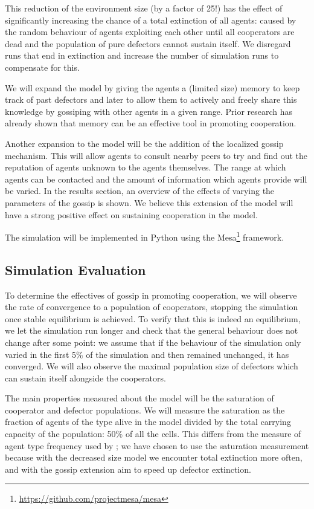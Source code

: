 \documentclass[english]{article}
\begin{document}
This reduction of the environment size (by a factor of 25!) has the effect of significantly increasing the chance of a total extinction of all agents:
caused by the random behaviour of agents exploiting each other until all cooperators are dead and the population of pure defectors cannot sustain itself.
We disregard runs that end in extinction and increase the number of simulation runs to compensate for this.

We will expand the model by giving the agents a (limited size) memory to keep track of past defectors and later to allow them to actively and freely share this knowledge by gossiping with other agents in a given range.
Prior research \citep{memory, reciprocity, adaptive-interaction} has already shown that memory can be an effective tool in promoting cooperation.

Another expansion to the model will be the addition of the localized gossip mechanism.
This will allow agents to consult nearby peers to try and find out the reputation of agents unknown to the agents themselves.
The range at which agents can be contacted and the amount of information which agents provide will be varied.
In the results section, an overview of the effects of varying the parameters of the gossip is shown.
We believe this extension of the model will have a strong positive effect on sustaining cooperation in the model.

The simulation will be implemented in Python using the Mesa\footnote{\url{https://github.com/projectmesa/mesa}} framework.

\subsection{Simulation Evaluation}

To determine the effectives of gossip in promoting cooperation, we will observe the rate of convergence to a population of cooperators, stopping the simulation once stable equilibrium is achieved.
To verify that this is indeed an equilibrium, we let the simulation run longer and check that the general behaviour does not change after some point:
we assume that if the behaviour of the simulation only varied in the first 5\% of the  simulation and then remained unchanged, it has converged.
We will also observe the maximal population size of defectors which can sustain itself alongside the cooperators.

The main properties measured about the model will be the saturation of cooperator and defector populations.
We will measure the saturation as the fraction of agents of the type alive in the model divided by
the total carrying capacity of the population: 50\% of all the cells.
This differs from the measure of agent type frequency used by \citet{smaldino};
we have chosen to use the saturation measurement because with the decreased size model we encounter total extinction more often,
and with the gossip extension aim to speed up defector extinction.
\end{document}
